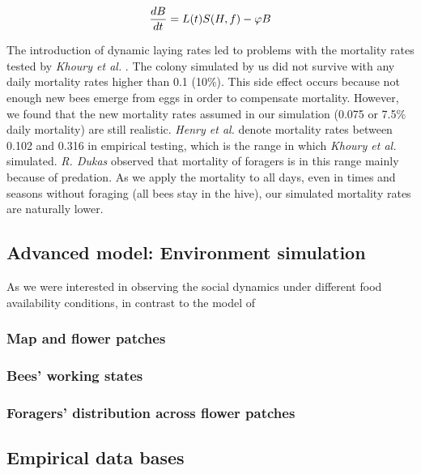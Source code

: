 		\begin{equation}\label{eq:changeBroodNumbersTime}
			{dB \over dt} = L(t)S(H,f)-\phi B
		\end{equation}
		
		The introduction of dynamic laying rates led to problems with the mortality rates tested by \textit{Khoury et al.} \cite{khoury13}. The colony simulated by us did not survive with any daily mortality rates higher than 0.1 (10\%). This side effect occurs because not enough new bees emerge from eggs in order to compensate mortality. However, we found that the new mortality rates assumed in our simulation (0.075 or 7.5\% daily mortality) are still realistic. \textit{Henry et al.} \cite{henry12} denote mortality rates between 0.102 and 0.316 in empirical testing, which is the range in which \textit{Khoury et al.} \cite{khoury13} simulated. \textit{R. Dukas} \cite{dukas08} observed that mortality of foragers is in this range mainly because of predation. As we apply the mortality to all days, even in times and seasons without foraging (all bees stay in the hive), our simulated mortality rates are naturally lower.
	
	\subsection{Advanced model: Environment simulation}
		
		As we were interested in observing the social dynamics under different food availability conditions, in contrast to the model of 
		\subsubsection{Map and flower patches}
		
		\subsubsection{Bees' working states}
			
		
		\subsubsection{Foragers' distribution across flower patches}
		
		
	\subsection{Empirical data bases}


